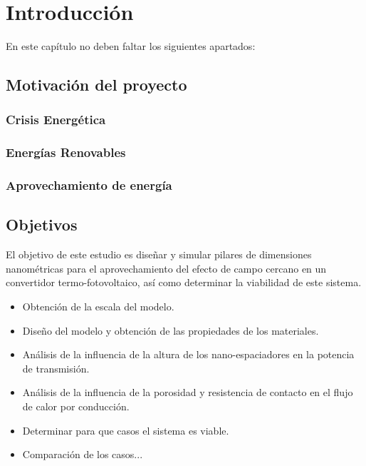\chapter{Introducción}

En este capítulo no deben faltar los siguientes apartados:

\section{Motivación del proyecto}

\subsection{Crisis Energética}
\subsection{Energías Renovables}

\subsection{Aprovechamiento de energía}



\section{Objetivos}
El objetivo de este estudio es diseñar y simular pilares de dimensiones nanométricas para el aprovechamiento del efecto de campo cercano en un convertidor termo-fotovoltaico, así como determinar la viabilidad de este sistema. 
\begin{itemize}
	\item Obtención de la escala del modelo.
	\item Diseño del modelo y obtención de las propiedades de los materiales.
	\item Análisis de la influencia de la altura de los nano-espaciadores en la potencia de transmisión.
	\item Análisis de la influencia de la porosidad y resistencia de contacto en el flujo de calor por conducción.
	\item Determinar para que casos el sistema es viable. 
	\item Comparación de los casos...
\end{itemize}


